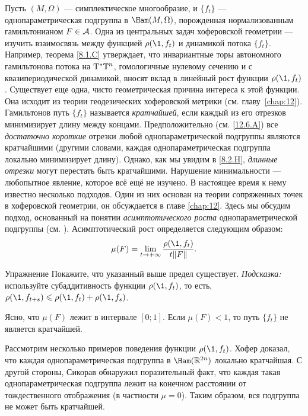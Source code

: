 Пусть $(M, \Omega)$ — симплектическое многообразие, и $\{f_t\}$ —
однопараметрическая подгруппа в $\Ham (M, \Omega)$, порожденная
нормализованным гамильтонианом $F \in \mathcal{A}$. 
Одна из центральных задач хоферовской геометрии — изучить
взаимосвязь между функцией $\rho (\1, f_t)$ и динамикой потока
$\{f_t\}$.
Например, теорема \ref{8.1.C} утверждает, что инвариантные торы
автономного гамильтонова потока на $\mathrm{T}^\ast \mathbb{T}^n$,  гомологичные
нулевому сечению и с квазипериодической динамикой, вносят вклад в
линейный рост функции $\rho (\1, f_t)$. 
Существует еще одна, чисто геометрическая причина интереса к этой функции.
Она исходит из теории геодезических хоферовской метрики (см. главу~\ref{chap:12}). 
Гамильтонов путь $\{f_t\}$ называется \emph{кратчайшей}, если каждый из его отрезков минимизирует длину между  концами.\?{}{}
Предположительно (см. \ref{12.6.A}) все {}\emph{достаточно короткие}
отрезки любой однопараметрической подгруппы являются кратчайшими
(другими словами, каждая однопараметрическая подгруппа локально
минимизирует длину). 
Однако, как мы увидим в \ref{8.2.H}, {}\emph{длинные отрезки} могут перестать
быть кратчайшими. 
Нарушение минимальности — любопытное явление, которое всё ещё не изучено.
В настоящее время к нему известно несколько подходов.
Один из них основан на теории сопряженных точек в хоферовской
геометрии, он обсуждается в главе \ref{chap:12}. 
Здесь мы обсудим подход, основанный на понятии \emph{асимптотического роста}
однопараметрической подгруппы (см. \cite{BP2}). 
Асимптотический рост определяется следующим образом: 
\[\mu(F)=\lim_{t \to + \infty}\frac{\rho (\1, f_t)}{ t \| F \|}.\]

\begin{ex*}{Упражнение}
Покажите, что указанный выше предел существует.
\emph{Подсказка:} используйте субаддитивность функции $\rho (\1, f_t)$, то есть, $\rho (\1, f_{t + s}) \le \rho (\1, f_t) + \rho (\1, f_s)$. 
\end{ex*}

Ясно, что $\mu (F)$ лежит в интервале $[0; 1]$.
Если $\mu (F) <1$, то путь $\{f_t\}$ не является кратчайшей.

Рассмотрим несколько примеров поведения функции $\rho (\1, f_t)$.
Хофер \cite{H2} доказал, что каждая однопараметрическая подгруппа в
$\Ham (\RR^{2n})$ локально кратчайшая. 
С другой стороны, Сикорав \cite{S2} обнаружил поразительный
факт, что каждая такая однопараметрическая подгруппа лежит на конечном расстоянии от тождественного отображения (в частности $\mu=0$).
Таким образом, вся подгруппа не может быть кратчайшей. 

